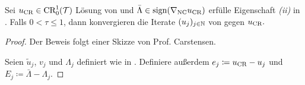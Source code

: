\begin{theorem}
  Sei $u_\textup{CR}\in \textup{CR}^1_0(\mathcal{T})$ Lösung von 
  und $\bar\Lambda\in\operatorname{sign}(\nabla_\textup{NC}u_\textup{CR})$ erfülle Eigenschaft 
  \textit{(ii)} in .
  Falls $0 < \tau \leq 1$, dann konvergieren die Iterate $(u_j)_{j\in\mathbb{N}}$ von
  gegen $u_\textup{CR}.$
\end{theorem}

\begin{proof}
  Der Beweis folgt einer Skizze von Prof. Carstensen.
  
  Seien $\tilde{u}_j$, $v_j$ und $\Lambda_j$ definiert wie in
  .
  Definiere außerdem $e_j \coloneqq u_\textup{CR}-u_j$ und $E_j\coloneqq
  \bar\Lambda-\Lambda_j$. 


\end{proof}
